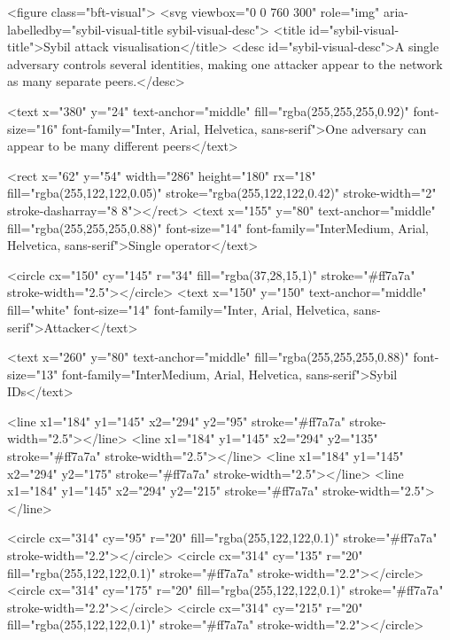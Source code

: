 \begin{rawhtml}
<figure class="bft-visual">
            <svg viewbox="0 0 760 300" role="img" aria-labelledby="sybil-visual-title sybil-visual-desc">
                <title id="sybil-visual-title">Sybil attack visualisation</title>
                <desc id="sybil-visual-desc">A single adversary controls several identities, making one attacker appear to the network as many separate peers.</desc>

                <text x="380" y="24" text-anchor="middle" fill="rgba(255,255,255,0.92)" font-size="16" font-family="Inter, Arial, Helvetica, sans-serif">One adversary can appear to be many different peers</text>

                <rect x="62" y="54" width="286" height="180" rx="18" fill="rgba(255,122,122,0.05)" stroke="rgba(255,122,122,0.42)" stroke-width="2" stroke-dasharray="8 8"></rect>
                <text x="155" y="80" text-anchor="middle" fill="rgba(255,255,255,0.88)" font-size="14" font-family="InterMedium, Arial, Helvetica, sans-serif">Single operator</text>

                <circle cx="150" cy="145" r="34" fill="rgba(37,28,15,1)" stroke="#ff7a7a" stroke-width="2.5"></circle>
                <text x="150" y="150" text-anchor="middle" fill="white" font-size="14" font-family="Inter, Arial, Helvetica, sans-serif">Attacker</text>

                <text x="260" y="80" text-anchor="middle" fill="rgba(255,255,255,0.88)" font-size="13" font-family="InterMedium, Arial, Helvetica, sans-serif">Sybil IDs</text>

                <line x1="184" y1="145" x2="294" y2="95" stroke="#ff7a7a" stroke-width="2.5"></line>
                <line x1="184" y1="145" x2="294" y2="135" stroke="#ff7a7a" stroke-width="2.5"></line>
                <line x1="184" y1="145" x2="294" y2="175" stroke="#ff7a7a" stroke-width="2.5"></line>
                <line x1="184" y1="145" x2="294" y2="215" stroke="#ff7a7a" stroke-width="2.5"></line>

                <circle cx="314" cy="95" r="20" fill="rgba(255,122,122,0.1)" stroke="#ff7a7a" stroke-width="2.2"></circle>
                <circle cx="314" cy="135" r="20" fill="rgba(255,122,122,0.1)" stroke="#ff7a7a" stroke-width="2.2"></circle>
                <circle cx="314" cy="175" r="20" fill="rgba(255,122,122,0.1)" stroke="#ff7a7a" stroke-width="2.2"></circle>
                <circle cx="314" cy="215" r="20" fill="rgba(255,122,122,0.1)" stroke="#ff7a7a" stroke-width="2.2"></circle>


\end{rawhtml}
